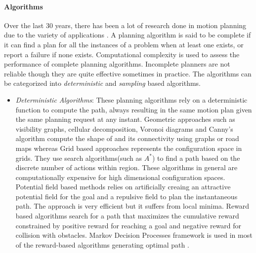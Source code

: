 \paragraph{Algorithms}Over the last 30 years, there has been a lot of research done in motion planning due to the variety of applications . A planning  algorithm is said to be complete if it can find a plan for all the instances of a problem when at least one exists, or report a failure if none exists. Computational complexity  is used to assess the performance of complete planning algorithms. Incomplete planners are not reliable though they are quite effective sometimes in practice. The algorithms can be categorized into \textit{deterministic} and \textit{sampling} based algorithms.
\begin{itemize}
\item \textit{Deterministic Algorithms}: These planning algorithms rely on a deterministic function to compute the path, always resulting in the same motion plan given the same planning request at any instant. Geometric approaches such as visibility graphs, cellular decomposition, Voronoi diagrams and Canny's algorithm compute the shape of \CSfree{} and its connectivity using graphs or road maps \cite{toth2004handbook,canny1988complexity} whereas Grid based approaches represents the configuration space in grids. They use search algorithms(such as $A^*$) to find a path based on the discrete number of actions within \CSfree{} region. These algorithms in general are computationally expensive for high dimensional configuration spaces. Potential field based methods \cite{barraquand1992numerical,koren1991potential} relies on artificially creaing an attractive potential field for the goal and a repulsive field to plan the instantaneous path. The approach is very efficient but it suffers from local minima. Reward based algorithms search for a path that maximizes the cumulative reward constrained by positive reward for reaching a goal and negative reward for collision with obstacles. Markov Decision Processes framework is used in most of the reward-based algorithms generating optimal path \cite{spaan2004point}. 

\end{itemize}
